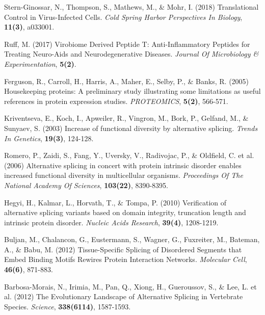 \documentclass[a4,center,fleqn]{NAR}
\begin{document}
\begin{thebibliography}{4}
Stern-Ginossar, N., Thompson, S., Mathews, M., \& Mohr, I. (2018)
Translational Control in Virus-Infected Cells. 
\textit{Cold Spring Harbor Perspectives In Biology}, \textbf{11(3)}, a033001. 

Ruff, M. (2017)
Virobiome Derived Peptide T: Anti-Inflammatory Peptides for Treating Neuro-Aids and Neurodegenerative Diseases. 
\textit{Journal Of Microbiology \& Experimentation}, \textbf{5(2)}.

Ferguson, R., Carroll, H., Harris, A., Maher, E., Selby, P., \& Banks, R. (2005) 
Housekeeping proteins: A preliminary study illustrating some limitations as useful references in protein expression studies. 
\textit{PROTEOMICS}, \textbf{5(2)}, 566-571. 

Kriventseva, E., Koch, I., Apweiler, R., Vingron, M., Bork, P., Gelfand, M., \& Sunyaev, S. (2003)
Increase of functional diversity by alternative splicing. 
\textit{Trends In Genetics}, \textbf{19(3)}, 124-128. 

Romero, P., Zaidi, S., Fang, Y., Uversky, V., Radivojac, P., \& Oldfield, C. et al. (2006)
Alternative splicing in concert with protein intrinsic disorder enables increased functional diversity in multicellular organisms. 
\textit{Proceedings Of The National Academy Of Sciences}, \textbf{103(22)}, 8390-8395. 

Hegyi, H., Kalmar, L., Horvath, T., \& Tompa, P. (2010)
Verification of alternative splicing variants based on domain integrity, truncation length and intrinsic protein disorder. 
\textit{Nucleic Acids Research}, \textbf{39(4)}, 1208-1219. 

Buljan, M., Chalancon, G., Eustermann, S., Wagner, G., Fuxreiter, M., Bateman, A., \& Babu, M. (2012)
Tissue-Specific Splicing of Disordered Segments that Embed Binding Motifs Rewires Protein Interaction Networks. 
\textit{Molecular Cell}, \textbf{46(6)}, 871-883. 

Barbosa-Morais, N., Irimia, M., Pan, Q., Xiong, H., Gueroussov, S., \& Lee, L. et al. (2012)
The Evolutionary Landscape of Alternative Splicing in Vertebrate Species. 
\textit{Science}, \textbf{338(6114)}, 1587-1593.


\end{thebibliography}
\end{document}
